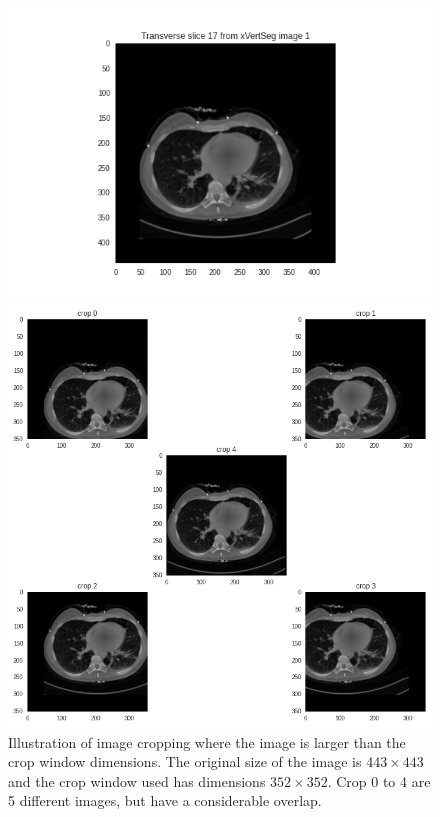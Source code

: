 \begin{figure}
    \centering
    \begin{minipage}{.99\textwidth}
        \includegraphics[width=.99\textwidth]{images/slice017.png}
    \end{minipage} 
    \begin{minipage}{0.99\textwidth}
        \includegraphics[width=.99\textwidth]{images/cropping_slice017.png}
    \end{minipage}
    \caption{
        Illustration of image cropping where the image is larger than the crop window dimensions. The original size of the image is $443 \times 443$ and the crop window used has dimensions $352 \times 352$.
        Crop 0 to 4 are 5 different images, but have a considerable overlap. \label{fig:crop}
        }
    
\end{figure}

